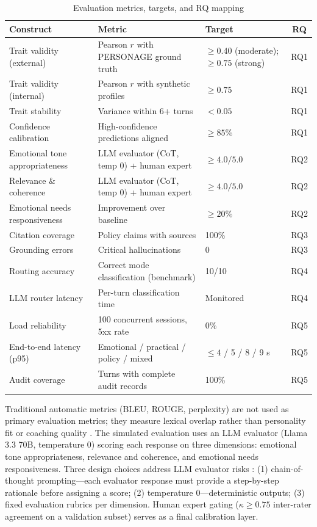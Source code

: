 \documentclass[10pt,a4paper]{report}
\begin{document}
\begin{table}[H]
\centering\footnotesize
\caption{Evaluation metrics, targets, and RQ mapping}
\begin{tabularx}{\textwidth}{@{}lXXc@{}}
\toprule
Construct & Metric & Target & RQ \\
\midrule
Trait validity (external) & Pearson $r$ with PERSONAGE ground truth & $\geq 0.40$ (moderate); $\geq 0.75$ (strong) & RQ1 \\
Trait validity (internal) & Pearson $r$ with synthetic profiles & $\geq 0.75$ & RQ1 \\
Trait stability & Variance within 6+ turns & $< 0.05$ & RQ1 \\
Confidence calibration & High-confidence predictions aligned & $\geq 85\%$ & RQ1 \\
Emotional tone appropriateness & LLM evaluator (CoT, temp 0) + human expert & $\geq 4.0/5.0$ & RQ2 \\
Relevance \& coherence & LLM evaluator (CoT, temp 0) + human expert & $\geq 4.0/5.0$ & RQ2 \\
Emotional needs responsiveness & Improvement over baseline & $\geq 20\%$ & RQ2 \\
Citation coverage & Policy claims with sources & 100\% & RQ3 \\
Grounding errors & Critical hallucinations & 0 & RQ3 \\
Routing accuracy & Correct mode classification (benchmark) & 10/10 & RQ4 \\
LLM router latency & Per-turn classification time & Monitored & RQ4 \\
Load reliability & 100 concurrent sessions, 5xx rate & 0\% & RQ5 \\
End-to-end latency (p95) & Emotional / practical / policy / mixed & $\leq 4$ / 5 / 8 / 9 s & RQ5 \\
Audit coverage & Turns with complete audit records & 100\% & RQ5 \\
\bottomrule
\end{tabularx}
\end{table}

Traditional automatic metrics (BLEU, ROUGE, perplexity) are not used as primary evaluation metrics; they measure lexical overlap rather than personality fit or coaching quality \citep{Yeh2021}. The simulated evaluation uses an LLM evaluator (Llama 3.3 70B, temperature 0) scoring each response on three dimensions: emotional tone appropriateness, relevance and coherence, and emotional needs responsiveness. Three design choices address LLM evaluator risks \citep{Guo2023}: (1) chain-of-thought prompting---each evaluator response must provide a step-by-step rationale before assigning a score; (2) temperature 0---deterministic outputs; (3) fixed evaluation rubrics per dimension. Human expert gating ($\kappa \geq 0.75$ inter-rater agreement on a validation subset) serves as a final calibration layer.
\end{document}
